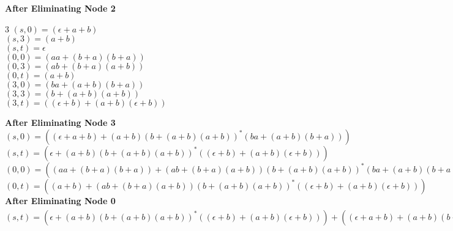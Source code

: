 \documentclass[12pt]{article}
\begin{document}
\noindent\textbf{After Eliminating Node 2}
\begin{multicols}{3}
\noindent
$(s,0) = (\epsilon + a+b)$\\
$(s,3) = (a+b)$\\
$(s,t) = \epsilon$\\
\columnbreak
\break
$(0,0) = (aa+(b+a)(b+a))$\\
$(0,3) = (ab+(b+a)(a+b))$\\
$(0,t) = (a+b)$\\
\columnbreak
\break
$(3,0) = (ba+(a+b)(b+a))$\\
$(3,3) = (b+(a+b)(a+b))$\\
$(3,t) = ((\epsilon+b)+(a+b)(\epsilon + b))$\\
\end{multicols}

\noindent\textbf{After Eliminating Node 3}\\
$(s,0) = ((\epsilon + a+b) + (a+b)(b+(a+b)(a+b))^*(ba+(a+b)(b+a)))$\\
$(s,t) = (\epsilon + (a+b)(b+(a+b)(a+b))^*((\epsilon+b)+(a+b)(\epsilon + b)))$\\
$(0,0) = ((aa+(b+a)(b+a)) + (ab+(b+a)(a+b))(b+(a+b)(a+b))^*(ba+(a+b)(b+a)))$\\
$(0,t) = ((a+b) + (ab+(b+a)(a+b))(b+(a+b)(a+b))^*((\epsilon+b)+(a+b)(\epsilon + b)))$\\

\noindent\textbf{After Eliminating Node 0}\\
$(s,t) = (\epsilon + (a+b)(b+(a+b)(a+b))^*((\epsilon+b)+(a+b)(\epsilon + b))) +
((\epsilon + a+b) + (a+b)(b+(a+b)(a+b))^*(ba+(a+b)(b+a)))
((aa+(b+a)(b+a)) + (ab+(b+a)(a+b))(b+(a+b)(a+b))^*(ba+(a+b)(b+a)))^*
((a+b) + (ab+(b+a)(a+b))(b+(a+b)(a+b))^*((\epsilon+b)+(a+b)(\epsilon + b)))
$\\
\end{document}
